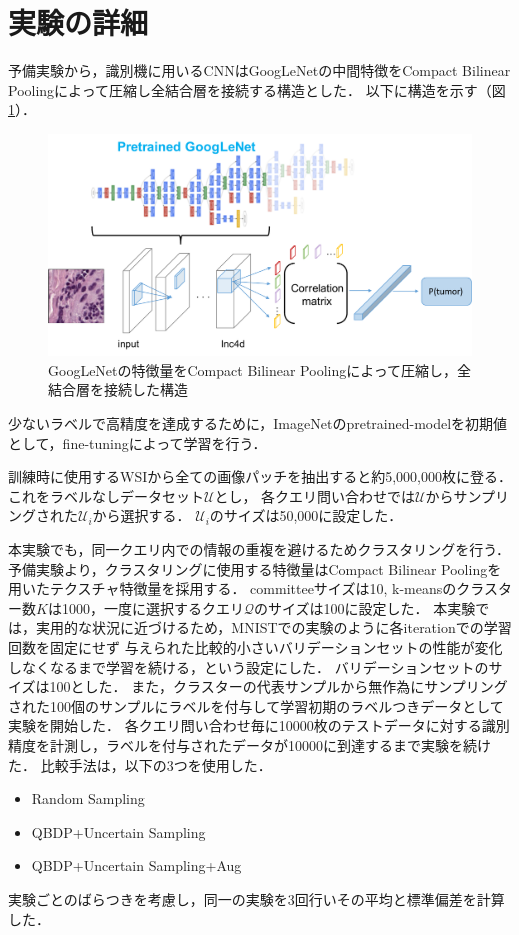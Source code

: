 \section{実験の詳細}
予備実験から，識別機に用いるCNNはGoogLeNetの中間特徴をCompact Bilinear Poolingによって圧縮し全結合層を接続する構造とした．
以下に構造を示す（図\ref{fig:googlenet_cbp}）．
\begin{figure}[tbp]
   \begin{center}
    \includegraphics[width=12cm]{figures/googlenet_cbp.pdf}
   \end{center}
  \caption{\label{fig:googlenet_cbp}GoogLeNetの特徴量をCompact Bilinear Poolingによって圧縮し，全結合層を接続した構造}
\end{figure}
少ないラベルで高精度を達成するために，ImageNetのpretrained-modelを初期値として，fine-tuningによって学習を行う．

訓練時に使用するWSIから全ての画像パッチを抽出すると約5,000,000枚に登る．これをラベルなしデータセット$\mathcal{U}$とし，
各クエリ問い合わせでは$\mathcal{U}$からサンプリングされた$\mathcal{U}_i$から選択する．
$\mathcal{U}_i$のサイズは50,000に設定した．

本実験でも，同一クエリ内での情報の重複を避けるためクラスタリングを行う．
予備実験より，クラスタリングに使用する特徴量はCompact Bilinear Poolingを用いたテクスチャ特徴量を採用する．
committeeサイズは10, k-meansのクラスター数$K$は1000，一度に選択するクエリ$\mathcal{Q}$のサイズは100に設定した．
本実験では，実用的な状況に近づけるため，MNISTでの実験のように各iterationでの学習回数を固定にせず
与えられた比較的小さいバリデーションセットの性能が変化しなくなるまで学習を続ける，という設定にした．
バリデーションセットのサイズは100とした．
また，クラスターの代表サンプルから無作為にサンプリングされた100個のサンプルにラベルを付与して学習初期のラベルつきデータとして実験を開始した．
各クエリ問い合わせ毎に10000枚のテストデータに対する識別精度を計測し，ラベルを付与されたデータが10000に到達するまで実験を続けた．
比較手法は，以下の3つを使用した．
\begin{itemize}
  \item Random Sampling
  \item QBDP+Uncertain Sampling
  \item QBDP+Uncertain Sampling+Aug
\end{itemize}
実験ごとのばらつきを考慮し，同一の実験を3回行いその平均と標準偏差を計算した．

